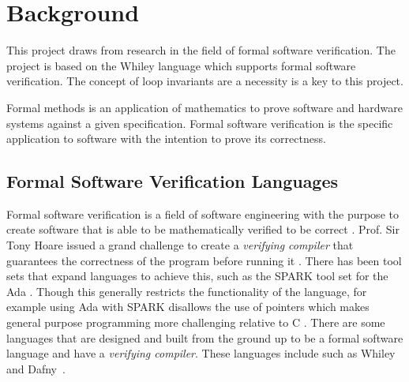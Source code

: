 \chapter{Background}\label{C:background}


This project draws from research in the field of formal software verification.
The project is based on the Whiley language which supports formal software
verification.
The concept of loop invariants are a necessity is a key to this project.

Formal methods is an application of mathematics to prove software and hardware
systems against a given specification. 
Formal software verification is the specific application to software with
the intention to prove its correctness.


\section{Formal Software Verification Languages}

Formal software verification is a field of software engineering with the
purpose to create software that is able to be mathematically verified to be
correct \cite{survey-formal-soft}.
Prof. Sir Tony Hoare issued a grand challenge to create a \textit{verifying compiler}
that guarantees the correctness of the program before running it \cite{Hoare-grand}.
There has been tool sets that expand languages to achieve this, such as
the SPARK tool set for the Ada \cite{spark-ada}\cite{spark-high-integ}.
Though this generally restricts the functionality of the language, for example
using Ada with SPARK disallows the use of pointers which makes general purpose
programming more challenging relative to C \cite{spark-ada}.
There are some languages that are designed and built from the ground up to
be a formal software language and have a \textit{verifying compiler}.
These languages include such as Whiley~\cite{whiley-origin} and Dafny~\cite{dafny-lang}.

